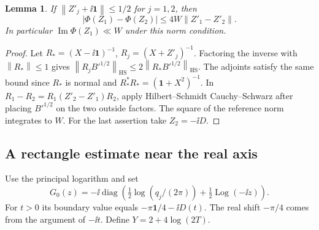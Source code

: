 \documentclass[11pt]{article}
\newtheorem{lemma}[theorem]{Lemma}
\DeclareMathOperator{\Log}{Log}\DeclareMathOperator{\tr}{tr}\DeclareMathOperator{\diag}{diag}
\newcommand{\Imn}{\operatorname{Im}}\newcommand{\Ren}{\operatorname{Re}}
\newcommand{\id}{\mathbf1}\newcommand{\norm}[1]{\left\lVert#1\right\rVert}
\newcommand{\ph}{\Phi}\newcommand{\Gm}{G_0}
\begin{document}
\begin{lemma}\label{lem:res}
If $\norm{Z'_j+\ii\id}\le1/2$ for $j=1,2$, then
\[
 |\ph(Z_1)-\ph(Z_2)|\le4 W\norm{Z'_1-Z'_2}.
\]
In particular $\Imn\ph(Z_1)\ll W$ under this norm condition.
\end{lemma}
\begin{proof}
Let $R_*=(X-\ii\id)^{-1}$, $R_j=(X+Z'_j)^{-1}$. Factoring the inverse with $\norm{R_*}\le1$ gives
$\norm{R_j B'^{1/2}}_{\mathrm{HS}}\le2\norm{R_*B'^{1/2}}_{\mathrm{HS}}$.
The adjoints satisfy the same bound since $R_*$ is normal and $R_*^*R_*=(\id+X^2)^{-1}$. In
$R_1-R_2=R_1(Z'_2-Z'_1)R_2$, apply Hilbert--Schmidt Cauchy--Schwarz after placing $B'^{1/2}$ on the two outside factors. The square of the reference norm integrates to $W$. For the last assertion take $Z_2=-\ii D$.
\end{proof}

\subsection{A rectangle estimate near the real axis}
Use the principal logarithm and set
\[
 \Gm(z)=-\ii\diag\left(\tfrac12\log(q_j/(2\pi))+\tfrac12\Log(-\ii z)\right).
\]
For $t>0$ its boundary value equals $-\pi\id/4-\ii D(t)$. The real shift $-\pi/4$ comes from the argument of $-\ii t$. Define $Y=2+4\log(2T)$.
\end{document}
